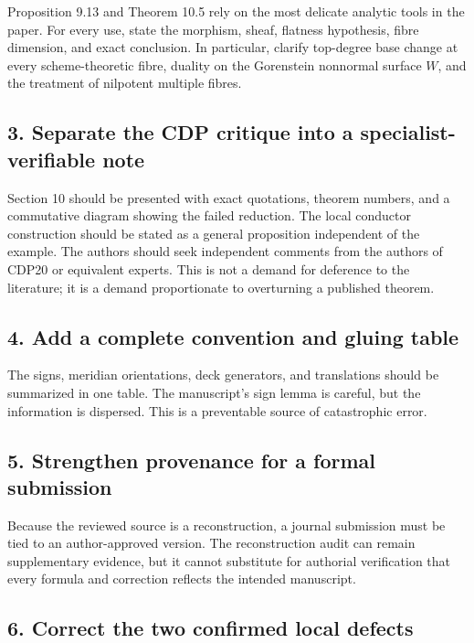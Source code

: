 \documentclass[
  10pt,
  letterpaper,
]{article}
\begin{document}
Proposition 9.13 and Theorem 10.5 rely on the most delicate analytic
tools in the paper. For every use, state the morphism, sheaf, flatness
hypothesis, fibre dimension, and exact conclusion. In particular,
clarify top-degree base change at every scheme-theoretic fibre, duality
on the Gorenstein nonnormal surface \(W\), and the treatment of
nilpotent multiple fibres.

\subsection{3. Separate the CDP critique into a specialist-verifiable
note}\label{separate-the-cdp-critique-into-a-specialist-verifiable-note}

Section 10 should be presented with exact quotations, theorem numbers,
and a commutative diagram showing the failed reduction. The local
conductor construction should be stated as a general proposition
independent of the example. The authors should seek independent comments
from the authors of CDP20 or equivalent experts. This is not a demand
for deference to the literature; it is a demand proportionate to
overturning a published theorem.

\subsection{4. Add a complete convention and gluing
table}\label{add-a-complete-convention-and-gluing-table}

The signs, meridian orientations, deck generators, and translations
should be summarized in one table. The manuscript's sign lemma is
careful, but the information is dispersed. This is a preventable source
of catastrophic error.

\subsection{5. Strengthen provenance for a formal
submission}\label{strengthen-provenance-for-a-formal-submission}

Because the reviewed source is a reconstruction, a journal submission
must be tied to an author-approved version. The reconstruction audit can
remain supplementary evidence, but it cannot substitute for authorial
verification that every formula and correction reflects the intended
manuscript.

\subsection{6. Correct the two confirmed local
defects}\label{correct-the-two-confirmed-local-defects}
\end{document}
